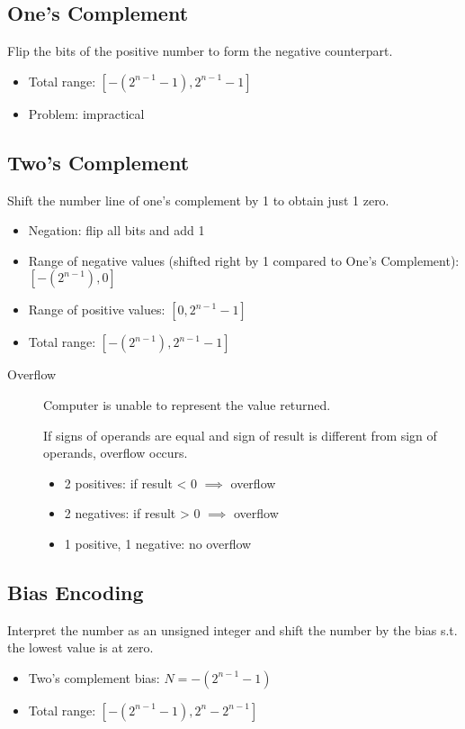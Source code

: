\subsection{One's Complement}
Flip the bits of the positive number to form the negative counterpart.
\begin{itemize}
	\item Total range: \([-(2^{n-1}-1), 2^{n-1}-1]\)
	\item Problem: impractical
\end{itemize}

\subsection{Two's Complement} 
Shift the number line of one's complement by 1 to obtain just 1 zero.
\begin{itemize}
	\item Negation: flip all bits and add 1
	\item Range of negative values (shifted right by 1 compared to One's Complement): \([-(2^{n-1}), 0]\)
	\item Range of positive values: \([0, 2^{n-1}-1]\)
	\item Total range: \([-(2^{n-1}), 2^{n-1}-1]\)
\end{itemize}

\begin{description}
	\item[Overflow] Computer is unable to represent the value returned.
	
	If signs of operands are equal and sign of result is different from sign of operands, overflow occurs. 
	\begin{itemize}
	    \item 2 positives: if result < 0 \(\implies\) overflow
	    \item 2 negatives: if result > 0 \(\implies\) overflow
	    \item 1 positive, 1 negative: no overflow
	\end{itemize}
\end{description}

\subsection{Bias Encoding}
Interpret the number as an unsigned integer and shift the number by the bias s.t. the lowest value is at zero.
\begin{itemize}
    \item Two's complement bias: \(N = -(2^{n-1}-1)\)
    \item Total range: \([-(2^{n-1}-1), 2^{n}-2^{n-1}]\)
\end{itemize}


